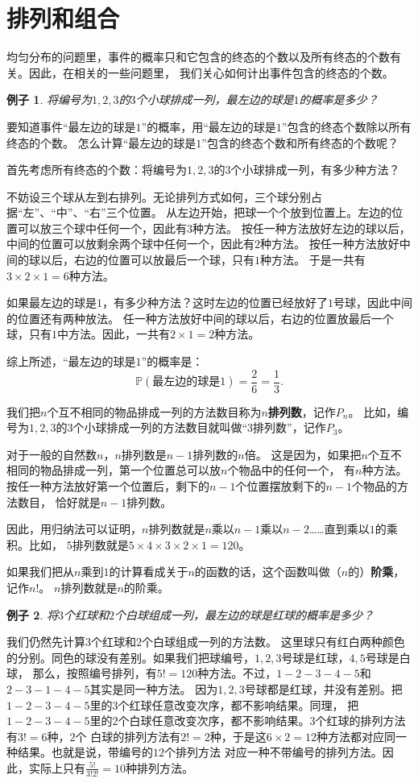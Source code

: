 \documentclass[12pt,UTF8]{ctexbook}
\newtheorem{ex}{例子}[section]
\begin{document}
\section{排列和组合}
均匀分布的问题里，事件的概率只和它包含的终态的个数以及所有终态的个数有关。因此，在相关的一些问题里，
我们关心如何计出事件包含的终态的个数。

\begin{ex}
    将编号为$1,2,3$的$3$个小球排成一列，最左边的球是$1$的概率是多少？
\end{ex}
要知道事件“最左边的球是$1$”的概率，用“最左边的球是$1$”包含的终态个数除以所有终态的个数。
怎么计算“最左边的球是$1$”包含的终态个数和所有终态的个数呢？

首先考虑所有终态的个数：将编号为$1,2,3$的$3$个小球排成一列，有多少种方法？

不妨设三个球从左到右排列。无论排列方式如何，三个球分别占据“左”、“中”、“右”三个位置。
从左边开始，把球一个个放到位置上。左边的位置可以放三个球中任何一个，因此有$3$种方法。
按任一种方法放好左边的球以后，中间的位置可以放剩余两个球中任何一个，因此有$2$种方法。
按任一种方法放好中间的球以后，右边的位置可以放最后一个球，只有$1$种方法。
于是一共有$3\times 2\times 1 = 6$种方法。

如果最左边的球是$1$，有多少种方法？这时左边的位置已经放好了$1$号球，因此中间的位置还有两种放法。
任一种方法放好中间的球以后，右边的位置放最后一个球，只有$1$中方法。因此，一共有$2\times 1 = 2$种方法。

综上所述，“最左边的球是$1$”的概率是：
$$ \mathbb{P}(\mbox{最左边的球是}1) = \frac{2}{6} = \frac{1}{3}. $$

我们把$n$个互不相同的物品排成一列的方法数目称为$n$\textbf{排列数}，记作$P_n$。
比如，编号为$1,2,3$的$3$个小球排成一列的方法数目就叫做“$3$排列数”，记作$P_3$。

对于一般的自然数$n$，$n$排列数是$n-1$排列数的$n$倍。
这是因为，如果把$n$个互不相同的物品排成一列，第一个位置总可以放$n$个物品中的任何一个，
有$n$种方法。按任一种方法放好第一个位置后，剩下的$n-1$个位置摆放剩下的$n-1$个物品的方法数目，
恰好就是$n-1$排列数。

因此，用归纳法可以证明，$n$排列数就是$n$乘以$n-1$乘以$n-2$……直到乘以$1$的乘积。比如，
$5$排列数就是$5\times 4\times 3\times 2\times 1 = 120$。

如果我们把从$n$乘到$1$的计算看成关于$n$的函数的话，这个函数叫做（$n$的）\textbf{阶乘}，记作$n!$。
$n$排列数就是$n$的阶乘。

\begin{ex}
    将$3$个红球和$2$个白球组成一列，最左边的球是红球的概率是多少？
\end{ex}
我们仍然先计算$3$个红球和$2$个白球组成一列的方法数。
这里球只有红白两种颜色的分别。同色的球没有差别。如果我们把球编号，$1,2,3$号球是红球，$4,5$号球是白球，
那么，按照编号排列，有$5! = 120$种方法。不过，$1-2-3-4-5$和$2-3-1-4-5$其实是同一种方法。
因为$1,2,3$号球都是红球，并没有差别。把$1-2-3-4-5$里的$3$个红球任意改变次序，都不影响结果。同理，
把$1-2-3-4-5$里的$2$个白球任意改变次序，都不影响结果。$3$个红球的排列方法有$3! = 6$种，$2$个
白球的排列方法有$2! = 2$种，于是这$6\times 2 = 12$种方法都对应同一种结果。也就是说，带编号的$12$个排列方法
对应一种不带编号的排列方法。因此，实际上只有$\frac{5!}{3!2!} = 10$种排列方法。
\end{document}
